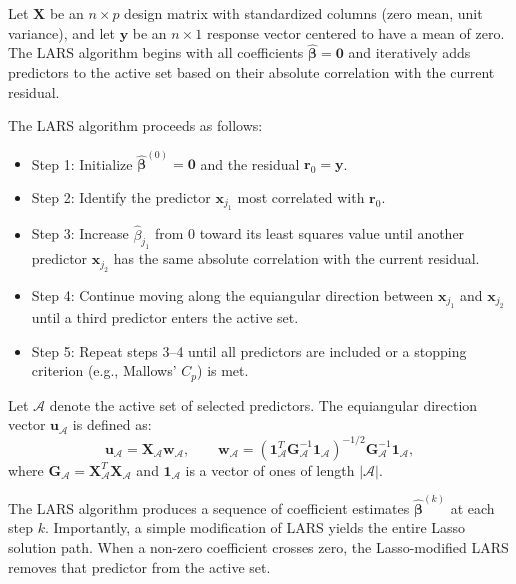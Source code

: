 \documentclass[twoside]{article}
\begin{document}
\begin{dfn}\label{df1}
Let $\mathbf{X}$ be an $n \times p$ design matrix with standardized columns (zero mean, unit variance), and let $\mathbf{y}$ be an $n \times 1$ response vector centered to have a mean of zero. The LARS algorithm begins with all coefficients $\boldsymbol{\hat{\beta}} = \mathbf{0}$ and iteratively adds predictors to the active set based on their absolute correlation with the current residual.
\end{dfn}

\begin{alg}\label{alg1}
The LARS algorithm proceeds as follows:
\begin{itemize}
    \item Step 1: Initialize $\boldsymbol{\hat{\beta}}^{(0)} = \mathbf{0}$ and the residual $\mathbf{r}_0 = \mathbf{y}$.
    \item Step 2: Identify the predictor $\mathbf{x}_{j_1}$ most correlated with $\mathbf{r}_0$.
    \item Step 3: Increase $\hat{\beta}_{j_1}$ from 0 toward its least squares value until another predictor $\mathbf{x}_{j_2}$ has the same absolute correlation with the current residual.
    \item Step 4: Continue moving along the equiangular direction between $\mathbf{x}_{j_1}$ and $\mathbf{x}_{j_2}$ until a third predictor enters the active set.
    \item Step 5: Repeat steps 3--4 until all predictors are included or a stopping criterion (e.g., Mallows' $C_p$) is met.
\end{itemize}
\end{alg}

Let $\mathcal{A}$ denote the active set of selected predictors. The equiangular direction vector $\mathbf{u}_{\mathcal{A}}$ is defined as:
\begin{equation}
\mathbf{u}_{\mathcal{A}} = \mathbf{X}_{\mathcal{A}} \mathbf{w}_{\mathcal{A}}, \qquad 
\mathbf{w}_{\mathcal{A}} = (\mathbf{1}_{\mathcal{A}}^T \mathbf{G}_{\mathcal{A}}^{-1} \mathbf{1}_{\mathcal{A}})^{-1/2} \mathbf{G}_{\mathcal{A}}^{-1} \mathbf{1}_{\mathcal{A}},
\end{equation}
where $\mathbf{G}_{\mathcal{A}} = \mathbf{X}_{\mathcal{A}}^T \mathbf{X}_{\mathcal{A}}$ and $\mathbf{1}_{\mathcal{A}}$ is a vector of ones of length $|\mathcal{A}|$.

The LARS algorithm produces a sequence of coefficient estimates $\boldsymbol{\hat{\beta}}^{(k)}$ at each step $k$. Importantly, a simple modification of LARS yields the entire Lasso solution path. When a non-zero coefficient crosses zero, the Lasso-modified LARS removes that predictor from the active set.
\end{document}
